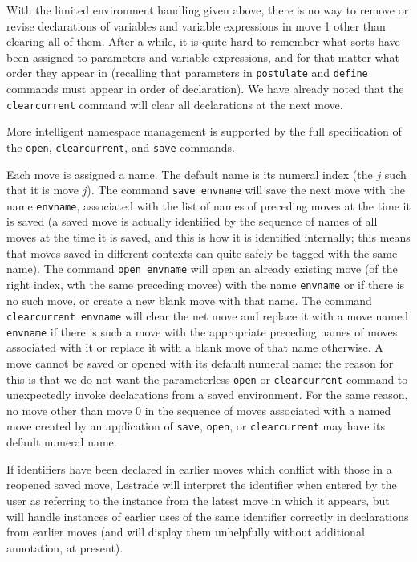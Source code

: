 \documentclass[12pt]{article}
\begin{document}
With the limited environment handling given above, there is no way to remove or revise declarations of variables and variable expressions in move 1 other than clearing all of them.  After a while, it is quite hard to remember what sorts have been assigned to parameters and variable expressions, and for that matter what order they appear in (recalling that parameters in {\tt postulate} and {\tt define} commands must appear in order of declaration).  We have already noted
that the {\tt clearcurrent} command will clear all declarations at the next move.

More intelligent namespace management is supported by the full specification of the {\tt open}, {\tt clearcurrent}, and {\tt save} commands.

Each move is assigned a name.  The default name is its numeral index (the $j$ such that it is move $j$).  The command {\tt save envname} will save the next move with the name
{\tt envname}, associated with the list of names of preceding moves at the time it is saved (a saved move is actually identified by the sequence of names of all moves at the time it is saved, and this is how it is identified internally;  this means that moves saved in different contexts can quite safely be tagged with the same name).  The command {\tt open envname} will open an already existing move (of the right index, wth the same preceding moves) with the name
{\tt envname} or if there is no such move, or create a new blank move with that name.  The command {\tt clearcurrent envname} will clear the net move and replace it with a move named {\tt envname} if there is such a move with the appropriate preceding names of moves associated with it or replace it with a blank move of that name otherwise.  A move cannot be saved or opened with its default numeral name:  the reason for this is that we do not want the
parameterless {\tt open} or {\tt clearcurrent} command to unexpectedly invoke declarations from a saved environment.  For the same reason, no move other than move 0 in the sequence of moves associated with a named move created by an application of {\tt save}, {\tt open}, or {\tt clearcurrent} may have its default numeral name.

If identifiers have been declared in earlier moves which conflict with those in a reopened saved move, Lestrade will interpret the identifier when entered by the user as referring to the instance from the latest move in which it appears, but will handle instances of earlier uses of the same identifier correctly in declarations from earlier moves (and will display them unhelpfully without additional annotation, at present).
\end{document}
